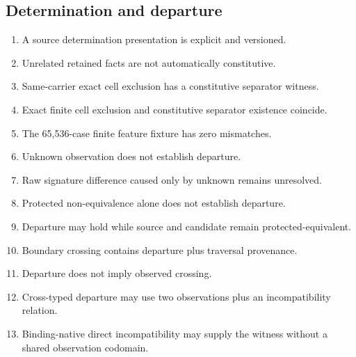 \documentclass[11pt,oneside]{article}
\begin{document}
\subsection{Determination and departure}
\begin{enumerate}
\item A source determination presentation is explicit and versioned.
\item Unrelated retained facts are not automatically constitutive.
\item Same-carrier exact cell exclusion has a constitutive separator witness.
\item Exact finite cell exclusion and constitutive separator existence coincide.
\item The 65,536-case finite feature fixture has zero mismatches.
\item Unknown observation does not establish departure.
\item Raw signature difference caused only by unknown remains unresolved.
\item Protected non-equivalence alone does not establish departure.
\item Departure may hold while source and candidate remain protected-equivalent.
\item Boundary crossing contains departure plus traversal provenance.
\item Departure does not imply observed crossing.
\item Cross-typed departure may use two observations plus an incompatibility relation.
\item Binding-native direct incompatibility may supply the witness without a shared observation codomain.
\end{enumerate}
\end{document}
